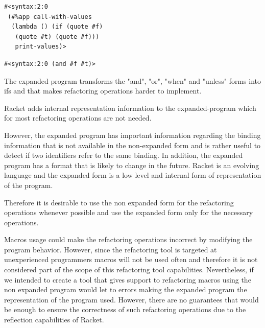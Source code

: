 \begin{lstlisting}[basicstyle=\ttfamily, caption="Expanded program"]
#<syntax:2:0
 (#%app call-with-values
  (lambda () (if (quote #f)
   (quote #t) (quote #f)))
   print-values)>
\end{lstlisting}

\begin{lstlisting}[basicstyle=\ttfamily, caption="Non expanded program"]
#<syntax:2:0 (and #f #t)>
\end{lstlisting}


The expanded program transforms the "and", "or", "when" and "unless" forms into
ifs and that makes refactoring operations harder to implement.

Racket adds internal representation information to the expanded-program which for
most refactoring operations are not needed.

However, the expanded program has important information regarding the binding
information that is not available in the non-expanded form and is rather useful
to detect if two identifiers refer to the same binding.
In addition, the expanded program has a format that is likely to change
in the future.
Racket is an evolving language and the expanded form is a low level and internal
form of representation of the program. %

Therefore it is desirable to use the non expanded form for the refactoring %
operations whenever possible and use the expanded form only for the necessary
operations.


Macros usage could make the refactoring operations incorrect by modifying the   %
program behavior.
However, since the refactoring tool is targeted at unexperienced programmers macros
will not be used often and therefore it is not considered part of the scope of
this refactoring tool capabilities.
Nevertheless, if we intended to create a tool that gives support to refactoring macros
using the non expanded program would let to errors making the expanded program the
representation of the program used.
However, there are no guarantees that would be enough to ensure the correctness of
such refactoring operations due to the reflection capabilities of Racket.

